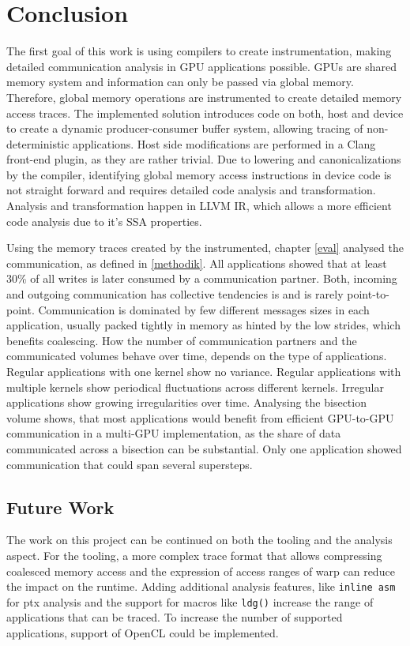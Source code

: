 \chapter{Conclusion}
The first goal of this work is using compilers to create  instrumentation, making detailed communication analysis in
GPU applications possible. GPUs are shared memory system and information can only be passed via global memory. Therefore, global memory operations are instrumented to create detailed memory access traces. The implemented solution introduces code on both, host and device to create a dynamic producer-consumer buffer system, allowing tracing of non-deterministic applications. Host side modifications are performed in a Clang front-end plugin, as they are rather trivial.
Due to lowering and canonicalizations by the compiler, identifying global memory access instructions in device code is not straight forward and requires detailed code analysis and transformation. Analysis and transformation happen in 
LLVM IR, which allows a more efficient code analysis due to it's SSA properties.

Using the memory traces created by the instrumented, chapter \ref{eval} analysed the communication, as defined in \ref{methodik}. All applications showed that at least 30\% of all writes is later consumed by a communication partner. Both, incoming and outgoing communication has collective tendencies is and is rarely point-to-point. Communication is dominated by few different messages sizes in each application, usually packed tightly in memory as hinted by the low strides, which benefits coalescing. How the number
of communication partners and the communicated volumes behave over time, depends on the type of applications. Regular applications with one kernel show no variance. Regular applications with multiple kernels show periodical fluctuations across different kernels. Irregular applications show growing irregularities over time. Analysing the bisection volume shows, that most applications would benefit from efficient GPU-to-GPU communication in a multi-GPU implementation, as the share of data communicated across 
a bisection can be substantial. Only one application showed communication that could span several supersteps.

\section{Future Work}
The work on this project can be continued on both the tooling and the analysis aspect. For the tooling, a more complex trace
format that allows compressing coalesced memory access and the expression of access ranges of warp can reduce the impact on 
the runtime. Adding additional analysis features, like \verb|inline asm| for ptx analysis and the support for macros 
like \verb|ldg()| increase the range of applications that can be traced. To increase the number of supported applications, support of OpenCL could be implemented.

